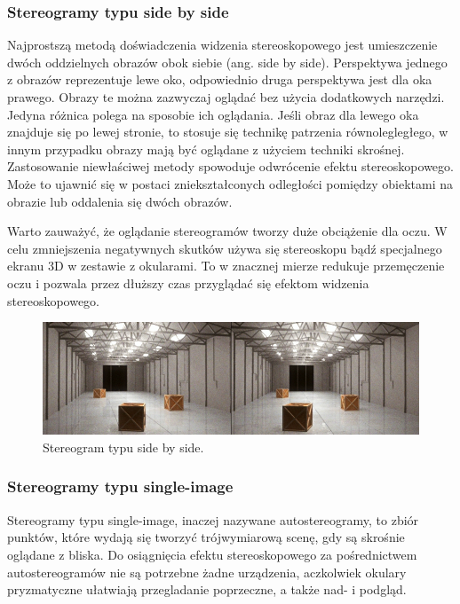 \subsubsection{Stereogramy typu side by side}
Najprostszą metodą doświadczenia widzenia stereoskopowego jest umieszczenie dwóch oddzielnych obrazów obok siebie (ang. side by side). Perspektywa jednego z obrazów reprezentuje lewe oko, odpowiednio druga perspektywa jest dla oka prawego. Obrazy te można zazwyczaj oglądać bez użycia dodatkowych narzędzi. Jedyna różnica polega na sposobie ich oglądania. Jeśli obraz dla lewego oka znajduje się po lewej stronie, to stosuje się technikę patrzenia równolegległego, w innym przypadku obrazy mają być oglądane z użyciem techniki skrośnej. Zastosowanie niewłaściwej metody spowoduje odwrócenie efektu stereoskopowego. Może to ujawnić się w postaci zniekształconych odległości pomiędzy obiektami na obrazie lub oddalenia się dwóch obrazów.

Warto zauważyć, że oglądanie stereogramów tworzy duże obciążenie dla oczu. W celu zmniejszenia negatywnych skutków używa się stereoskopu bądź specjalnego ekranu 3D w zestawie z okularami. To w znacznej mierze redukuje przemęczenie oczu i pozwala przez dłuższy czas przyglądać się efektom widzenia stereoskopowego.
\begin{figure}[H]
		\centering
 		\includegraphics[width=12cm]{sbs.jpg}
    	\caption{Stereogram typu side by side\cite{sidebyside}.}
 		\label{rys1}
\end{figure}

\subsubsection{Stereogramy typu single-image} 
Stereogramy typu single-image, inaczej nazywane autostereogramy, to zbiór punktów, które wydają się tworzyć trójwymiarową scenę, gdy są skrośnie oglądane z bliska. Do osiągnięcia efektu stereoskopowego za pośrednictwem autostereogramów nie są potrzebne żadne urządzenia, aczkolwiek okulary pryzmatyczne ułatwiają przegladanie poprzeczne, a także nad- i podgląd.

